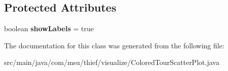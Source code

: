 \subsection*{Protected Attributes}
\begin{DoxyCompactItemize}
\item 
\hypertarget{classcom_1_1msu_1_1thief_1_1visualize_1_1ColoredTourScatterPlot_a1fd8f917b7e756f90aa505a578bae153}{boolean {\bfseries show\-Labels} = true}\label{classcom_1_1msu_1_1thief_1_1visualize_1_1ColoredTourScatterPlot_a1fd8f917b7e756f90aa505a578bae153}

\end{DoxyCompactItemize}


The documentation for this class was generated from the following file\-:\begin{DoxyCompactItemize}
\item 
src/main/java/com/msu/thief/visualize/Colored\-Tour\-Scatter\-Plot.\-java\end{DoxyCompactItemize}

